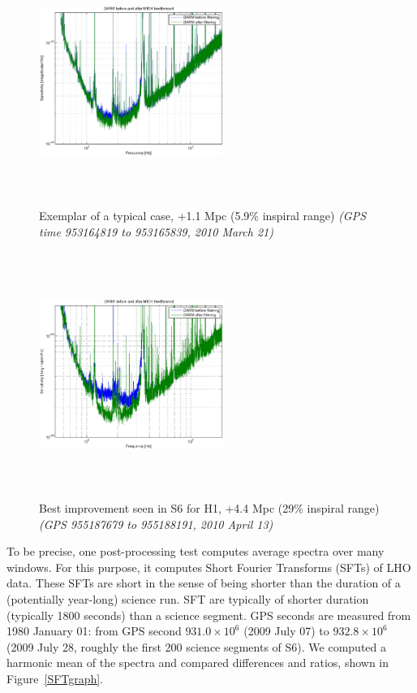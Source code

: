 \begin{figure}
\begin{center}
\includegraphics[height=80mm, width=60mm]{figure11.eps}
\caption{Exemplar of a typical case, +1.1 Mpc (5.9\% inspiral range)
\textit{(GPS time 953164819 to 953165839, 2010 March 21)}}
\label{typicalInspiralGraph}
\end{center}
\end{figure}
\begin{figure}
\begin{center}
\includegraphics[height=80mm, width=60mm]{figure12.eps}
\caption{Best improvement seen in S6 for H1, +4.4 Mpc (29\% inspiral range)
\textit{(GPS 955187679 to 955188191, 2010 April 13)}}
\label{bestInspiralGraph}
\end{center}
\end{figure}

To be precise, one post-processing test computes average spectra over many windows. For this purpose, it computes Short Fourier Transforms (SFTs) of LHO data. These SFTs are short in the sense of being shorter than the duration of a (potentially year-long) science run. SFT are typically of shorter duration (typically 1800 seconds) than a science segment.  GPS seconds are measured from 1980 January 01: from GPS second $931.0\times 10^6$ (2009 July 07) to $932.8\times 10^6$ (2009 July 28, roughly the first 200 science segments of S6). We computed a harmonic mean of the spectra and compared differences and ratios, shown in Figure~\ref{SFTgraph}.


